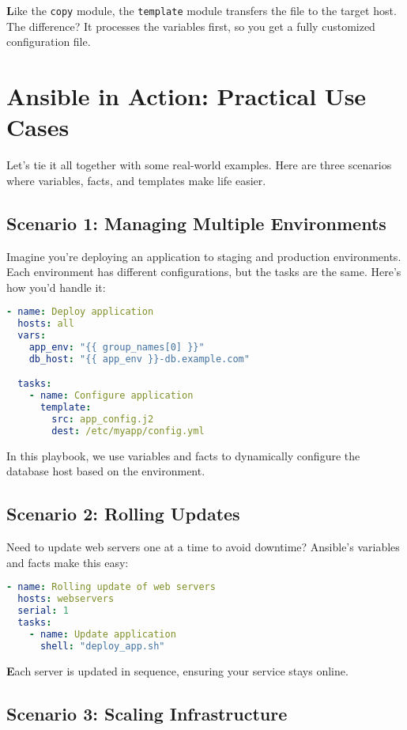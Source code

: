 \textbf{L}ike the \texttt{copy} module, the \texttt{template} module transfers the file to the target host. The difference? It processes the variables first, so you get a fully customized configuration file.


\section{Ansible in Action: Practical Use Cases}

Let's tie it all together with some real-world examples. Here are three scenarios where variables, facts, and templates make life easier.

\subsection{Scenario 1: Managing Multiple Environments}

Imagine you're deploying an application to staging and production environments. Each environment has different configurations, but the tasks are the same. Here's how you'd handle it:
\begin{lstlisting}[language=yaml, caption=Playbook for Multiple Environments]
- name: Deploy application
  hosts: all
  vars:
    app_env: "{{ group_names[0] }}"
    db_host: "{{ app_env }}-db.example.com"

  tasks:
    - name: Configure application
      template:
        src: app_config.j2
        dest: /etc/myapp/config.yml
\end{lstlisting}

In this playbook, we use variables and facts to dynamically configure the database host based on the environment.

\subsection{Scenario 2: Rolling Updates}

Need to update web servers one at a time to avoid downtime? Ansible's variables and facts make this easy:
\begin{lstlisting}[language=yaml, caption=Rolling Updates Playbook]
- name: Rolling update of web servers
  hosts: webservers
  serial: 1
  tasks:
    - name: Update application
      shell: "deploy_app.sh"
\end{lstlisting}

\textbf{E}ach server is updated in sequence, ensuring your service stays online.

\subsection{Scenario 3: Scaling Infrastructure}

